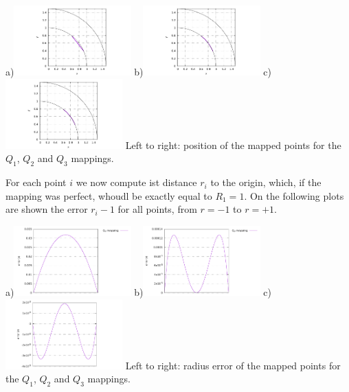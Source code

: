 \begin{center}
a)\includegraphics[width=4.5cm]{images/mappings/curved/xy1.pdf}
b)\includegraphics[width=4.5cm]{images/mappings/curved/xy2.pdf}
c)\includegraphics[width=4.5cm]{images/mappings/curved/xy3.pdf}
{\small Left to right: position of the mapped points for the $Q_1$, $Q_2$ and $Q_3$ mappings.}
\end{center}

For each point $i$ we now compute ist distance $r_i$ 
to the origin, which, if the 
mapping was perfect, whoudl be exactly equal to $R_1=1$. 
On the following plots are shown the error $r_i-1$ for all 
points, from $r=-1$ to $r=+1$.

\begin{center}
a)\includegraphics[width=4.5cm]{images/mappings/curved/innerline_error_Q1mapping.pdf}
b)\includegraphics[width=4.5cm]{images/mappings/curved/innerline_error_Q2mapping.pdf}
c)\includegraphics[width=4.5cm]{images/mappings/curved/innerline_error_Q3mapping.pdf}
{\small Left to right: radius error of the mapped points for the $Q_1$, $Q_2$ and $Q_3$ mappings.}
\end{center}

